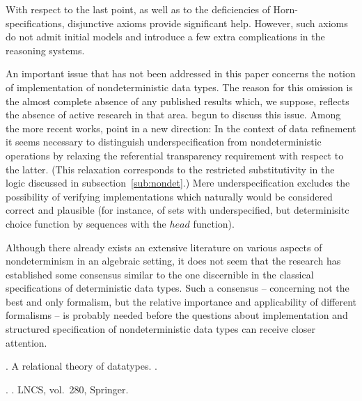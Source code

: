 {With respect to the last point, as well as to the deficiencies of Horn-specifications, disjunctive axioms 
provide significant help. However, such axioms do not admit initial models and introduce a few extra 
complications in the reasoning systems.

An important issue that has not been addressed in this paper concerns
the notion of implementation of nondeterministic data types. The
reason for this omission is the almost complete absence of any
published results which, we suppose, reflects the absence of active
research in that area. \cite{c:53, c:93} begun to discuss this issue.
Among the more recent works, \cite{c:107, c:132} point in a new
direction: In the context of data refinement it seems necessary to
distinguish underspecification from nondeterministic operations by
relaxing the referential transparency requirement with respect to the
latter. (This relaxation corresponds to the restricted substitutivity
in the logic discussed in subsection~\ref{sub:nondet}.) Mere
underspecification excludes the possibility of verifying
implementations which naturally would be considered correct and
plausible  (for instance, of sets with underspecified, but determinisitc 
choice function  by sequences with
the $head$ function).

Although there already exists an extensive literature on various aspects of nondeterminism in an 
algebraic setting, it does not seem that the research has established some consensus similar to the one 
discernible in the classical specifications of deterministic data types. 
Such a consensus -- concerning not the 
best and only formalism, but the relative importance and applicability 
of different formalisms -- is 
probably needed before the questions about implementation and structured specification of 
nondeterministic data types can receive closer attention. 

\begin{thebibliography}{}

 .
\newblock A relational theory of datatypes.
\newblock [draft available at
  URL = http://www.win.tue.nl/win/cs/wp/papers/papers.html].

 .
\newblock {}.
\newblock LNCS, vol.~280, Springer.


\end{thebibliography}}
